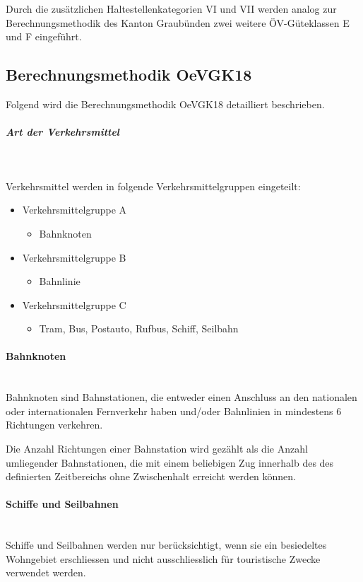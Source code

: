 Durch die zusätzlichen Haltestellenkategorien VI und VII werden analog zur Berechnungsmethodik des Kanton Graubünden zwei weitere ÖV-Güteklassen E und F eingeführt.

\subsection{Berechnungsmethodik OeVGK18}
\label{Berechnungsmethodik OeVGK18}
Folgend wird die Berechnungsmethodik \gls{OeVGK18} detailliert beschrieben.

\subparagraph{Art der Verkehrsmittel}~\\
\label{Berechnungsmethodik OeVGK18:Art der Verkehrsmittel}

Verkehrsmittel werden in folgende Verkehrsmittelgruppen eingeteilt:

\begin{itemize}[noitemsep]
    \item Verkehrsmittelgruppe A
    \begin{itemize}
        \item Bahnknoten
    \end{itemize}
    \item Verkehrsmittelgruppe B
    \begin{itemize}
        \item Bahnlinie
    \end{itemize}
    \item Verkehrsmittelgruppe C
    \begin{itemize}
        \item Tram, Bus, Postauto, Rufbus, Schiff, Seilbahn
    \end{itemize}
\end{itemize}

\paragraph{Bahnknoten}~\\
Bahnknoten sind Bahnstationen, die entweder einen Anschluss an den nationalen oder internationalen Fernverkehr haben und/oder Bahnlinien in mindestens 6 Richtungen verkehren.

Die Anzahl Richtungen einer Bahnstation wird gezählt als die Anzahl umliegender Bahnstationen, die mit einem beliebigen Zug innerhalb des des definierten Zeitbereichs ohne Zwischenhalt erreicht werden können.

\paragraph{Schiffe und Seilbahnen}~\\
Schiffe und Seilbahnen werden nur berücksichtigt, wenn sie ein besiedeltes Wohngebiet erschliessen und nicht ausschliesslich für touristische Zwecke verwendet werden.


